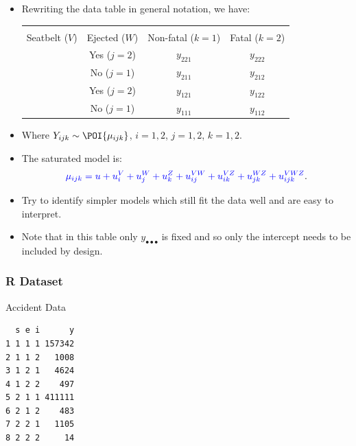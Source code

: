 \documentclass[oneside]{book}\usepackage[]{graphicx}\usepackage[svgnames]{xcolor}
\makeatletter
\newenvironment{kframe}{%
 \def\at@end@of@kframe{}%
 \ifinner\ifhmode%
  \def\at@end@of@kframe{\end{minipage}}%
  \begin{minipage}{\columnwidth}%
 \fi\fi%
 \def\FrameCommand##1{\hskip\@totalleftmargin \hskip-\fboxsep
 \colorbox{shadecolor}{##1}\hskip-\fboxsep
     \hskip-\linewidth \hskip-\@totalleftmargin \hskip\columnwidth}%
 \MakeFramed {\advance\hsize-\width
   \@totalleftmargin\z@ \linewidth\hsize
   \@setminipage}}%
 {\par\unskip\endMakeFramed%
 \at@end@of@kframe}
\newenvironment{knitrout}{}{} %
\let\log\relax%
\makeatother
\begin{document}
\begin{itemize}
    \item Rewriting the data table in general notation, we have:
          \begin{table}[H]
              \centering
              \begin{NiceTabular}{cccc}
                  \toprule
                  &                 &            \\
                  Seatbelt ($ V $) & Ejected ($ W $) & Non-fatal ($ k=1 $) & Fatal ($ k=2 $)          \\
                  \midrule
                   & Yes  ($ j=2 $) & $ y_{221} $ & $ y_{222} $\\
                  & No  ($ j=1 $) & $ y_{211} $ & $ y_{212} $\\
                   & Yes ($ j=2 $) & $ y_{121} $ & $ y_{122} $\\
                  & No ($ j=1 $) & $ y_{111} $ & $ y_{112} $\\
                  \bottomrule
              \end{NiceTabular}
          \end{table}
    \item Where $ Y_{ijk}\sim \POI{\mu_{ijk}} $, $ i=1,2 $, $ j=1,2 $, $ k=1,2 $.
    \item The saturated model is:
          \[ \textcolor{Blue}{\log{\mu_{ijk}}=u+u_i^V+u_j^W+u_k^Z+u_{ij}^{VW}+u_{ik}^{VZ}+u_{jk}^{WZ}+u_{ijk}^{VWZ}}. \]
    \item Try to identify simpler models which still fit the data well and are easy to interpret.
    \item Note that in this table only $ y_{\bullet\bullet\bullet} $ is fixed and so only the intercept needs to be
          included by design.
\end{itemize}
\subsubsection*{R Dataset}
\begin{Example}{Accident Data}
\begin{knitrout}
\color{fgcolor}\begin{kframe}
\begin{verbatim}
  s e i      y
1 1 1 1 157342
2 1 1 2   1008
3 1 2 1   4624
4 1 2 2    497
5 2 1 1 411111
6 2 1 2    483
7 2 2 1   1105
8 2 2 2     14
\end{verbatim}
\end{kframe}
\end{knitrout}
\end{Example}
\end{document}
